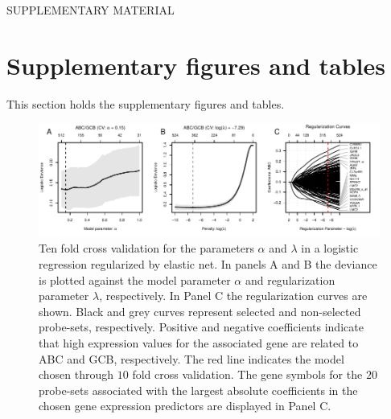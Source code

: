\documentclass{article}
\begin{document}
\renewcommand{\theequation}{S\arabic{equation}}
\renewcommand{\thefigure}{S\arabic{figure}}
\renewcommand{\thetable}{S\arabic{table}}
\renewcommand{\thesection}{S\arabic{section}}

\setcounter{section}{0}
\setcounter{subsection}{0}
\setcounter{equation}{0}
\setcounter{figure}{0}
\setcounter{table}{0}
\setcounter{page}{1}


{}
\begin{center}
{\huge SUPPLEMENTARY MATERIAL}\bigskip \\
{\bf \hemaClassTitle{}}
\end{center}

\section{Supplementary figures and tables}
This section holds the supplementary figures and tables.

\begin{figure}[htb]
\begin{center}
\includegraphics[width=1\textwidth]{figures/figureS1.pdf}
\end{center}
\caption{Ten fold cross validation for the parameters $\alpha$ and $\lambda$ in a logistic regression regularized by elastic net.
In panels A and B the deviance is plotted against the model parameter $\alpha$ and regularization parameter $\lambda$, respectively.
In Panel C the regularization curves are shown.
Black and grey curves represent selected and non-selected probe-sets, respectively.
Positive and negative coefficients indicate that high expression values for the associated gene are related to ABC and GCB, respectively.
The red line indicates the model chosen through $10$ fold cross validation.
The gene symbols for the $20$ probe-sets associated with the largest absolute coefficients in the chosen gene expression predictors are displayed in Panel C.}
\label{fig:crossval}
\end{figure}
\end{document}
